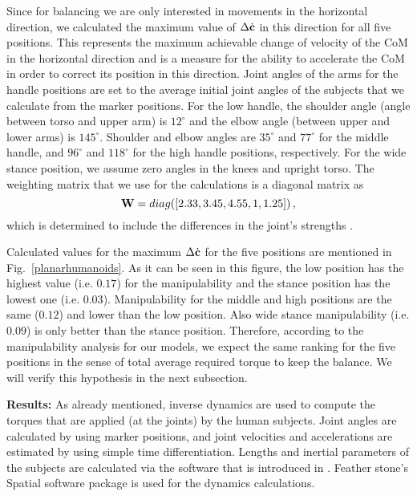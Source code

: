 Since for balancing we are only interested in movements in the horizontal
direction, we calculated the maximum value of $\Delta \dot{\mathbf{c}}$ in this
direction for all five positions.  This represents the maximum achievable
change of velocity of the CoM in the horizontal direction and is a measure for
the ability to accelerate the CoM in order to correct its position in this
direction. Joint angles of the arms for the handle positions are
set to the average initial joint angles of the subjects that we calculate from
the marker positions.  For the low handle, the shoulder angle (angle between
torso and upper arm) is $12^\circ$ and the elbow angle (between upper and
lower arms) is $145^\circ$.  Shoulder and elbow angles are $35^\circ$ and
$77^\circ$ for the middle handle, and $96^\circ$ and $118^\circ$ for the high
handle positions, respectively.  For the wide stance position, we assume zero
angles in the knees and upright torso.  The weighting matrix that we use for
the calculations is a diagonal matrix as
%
\begin{equation}
\mathbf{W} = diag([2.33, 3.45, 4.55, 1, 1.25]) \, ,
\end{equation}
%
which is determined to include the differences in the joint's strengths
\cite{Anderson2007, Bober2002, Gandevia1998, Moraux2013}.

Calculated values for the maximum $\Delta \dot{\mathbf{c}}$ for the five positions
are mentioned in Fig.~\ref{planarhumanoids}.  As it can be seen in this
figure, the low position has the highest value (i.e. $0.17$) for the
manipulability and the stance position has the lowest one (i.e. $0.03$).
Manipulability for the middle and high positions are the same ($0.12$) and
lower than the low position.  Also wide stance manipulability (i.e. $0.09$) is
only better than the stance position.  Therefore, according to the
manipulability analysis for our models, we expect the same ranking for the
five positions in the sense of total average required torque to keep the
balance.  We will verify this hypothesis in the next subsection.


\textbf{Results:} As already mentioned, inverse dynamics are used to compute the torques that
are applied (at the joints) by the human subjects.  Joint angles are
calculated by using marker positions, and joint velocities and accelerations
are estimated by using simple time differentiation.  Lengths and inertial
parameters of the subjects are calculated via the software that is introduced
in \cite{Zlajpah&Babic14}.  Feather stone's Spatial software package
\cite{Featherstone} is used for the dynamics calculations.

